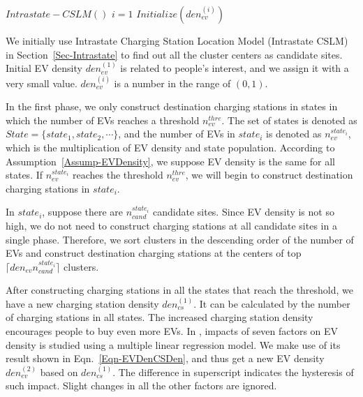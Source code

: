\documentclass{mcmthesis}
\begin{document}
\begin{algorithm}[htbp]
\caption{$Iterative Evolution$}\label{Alg-IterativeEvolution}
$Intrastate-CSLM()$\;
$i=1$\;
$Initialize(den_{ev}^{(i)})$\;
\;
\end{algorithm}

We initially use Intrastate Charging Station Location Model (Intrastate CSLM) in Section~\ref{Sec-Intrastate} to find out all the cluster centers as candidate sites. Initial EV density $den_{ev}^{(1)}$ is related to people's interest, and we assign it with a very small value. $den_{ev}^{(i)}$ is a number in the range of $(0,1)$.

In the first phase, we only construct destination charging stations in states in which the number of EVs reaches a threshold $n_{ev}^{thre}$. The set of states is denoted as $State=\{state_{1},state_{2},\cdots\}$, and the number of EVs in $state_{i}$ is denoted as $n_{ev}^{state_{i}}$, which is the multiplication of EV density and state population. According to Assumption~\ref{Assump-EVDensity}, we suppose EV density is the same for all states. If $n_{ev}^{state_{i}}$ reaches the threshold $n_{ev}^{thre}$, we will begin to construct destination charging stations in $state_{i}$.

In $state_{i}$, suppose there are $n_{cand}^{state_{i}}$ candidate sites. Since EV density is not so high, we do not need to construct charging stations at all candidate sites in a single phase. Therefore, we sort clusters in the descending order of the number of EVs and construct destination charging stations at the centers of top $\lceil den_{ev}n_{cand}^{state_{i}} \rceil$ clusters.

After constructing charging stations in all the states that reach the threshold, we have a new charging station density $den_{cs}^{(1)}$. It can be calculated by the number of charging stations in all states. The increased charging station density encourages people to buy even more EVs. In \cite{Li2017}, impacts of seven factors on EV density is studied using a multiple linear regression model. We make use of its result shown in Eqn.~\eqref{Eqn-EVDenCSDen}, and thus get a new EV density $den_{ev}^{(2)}$ based on $den_{cs}^{(1)}$. The difference in superscript indicates the hysteresis of such impact. Slight changes in all the other factors are ignored.
\end{document}
